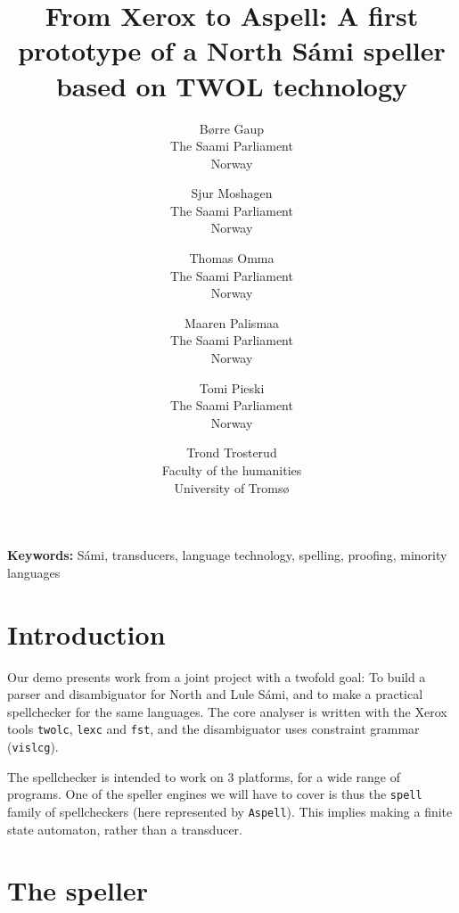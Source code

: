 \documentclass[a4paper,english]{article}
\begin{document}
\title{From Xerox to Aspell: A first prototype of a North Sámi speller
 based on TWOL technology}


\author{Børre Gaup\\ The Saami Parliament\\ Norway
\and Sjur Moshagen\\ The Saami Parliament\\ Norway
\and Thomas Omma\\ The Saami Parliament\\ Norway
\and Maaren Palismaa\\ The Saami Parliament\\ Norway
\and Tomi Pieski\\ The Saami Parliament\\ Norway
\and Trond Trosterud\\ Faculty of the humanities\\ University of Tromsø}

\maketitle

\textbf{Keywords:} Sámi, transducers, language technology, spelling,
 proofing, minority languages

\section{Introduction}

Our demo presents work from a joint project with a twofold goal: To build a parser and disambiguator for North and Lule Sámi, and to make a practical spellchecker for the same languages. The core analyser is written with the Xerox tools \texttt{twolc}, \texttt{lexc} and \texttt{fst}, and the disambiguator uses constraint grammar (\texttt{vislcg}).

The spellchecker is intended to work on 3 platforms, for a wide range of programs. One of the speller engines we will have to cover is thus the \texttt{spell} family of spellcheckers (here represented by \texttt{Aspell}). This implies making a finite state automaton, rather than a transducer.

\section{The speller}
\end{document}

